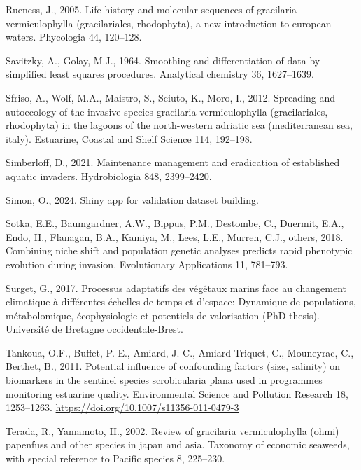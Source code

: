 \documentclass[
  letterpaper,
  DIV=11,
  numbers=noendperiod]{scrartcl}
\newlength{\cslhangindent}
\newenvironment{CSLReferences}[2] %
 {\begin{list}{}{%
  \setlength{\itemindent}{0pt}
  \setlength{\leftmargin}{0pt}
  \setlength{\parsep}{0pt}
  \ifodd #1
   \setlength{\leftmargin}{\cslhangindent}
   \setlength{\itemindent}{-1\cslhangindent}
  \fi
  \setlength{\itemsep}{#2\baselineskip}}}
 {\end{list}}
\begin{document}
\begin{CSLReferences}{1}{0}
Rueness, J., 2005. Life history and molecular sequences of gracilaria
vermiculophylla (gracilariales, rhodophyta), a new introduction to
european waters. Phycologia 44, 120--128.

Savitzky, A., Golay, M.J., 1964. Smoothing and differentiation of data
by simplified least squares procedures. Analytical chemistry 36,
1627--1639.

Sfriso, A., Wolf, M.A., Maistro, S., Sciuto, K., Moro, I., 2012.
Spreading and autoecology of the invasive species gracilaria
vermiculophylla (gracilariales, rhodophyta) in the lagoons of the
north-western adriatic sea (mediterranean sea, italy). Estuarine,
Coastal and Shelf Science 114, 192--198.

Simberloff, D., 2021. Maintenance management and eradication of
established aquatic invaders. Hydrobiologia 848, 2399--2420.

Simon, O., 2024.
\href{https://oirysimon.shinyapps.io/shiny_validate/}{Shiny app for
validation dataset building}.

Sotka, E.E., Baumgardner, A.W., Bippus, P.M., Destombe, C., Duermit,
E.A., Endo, H., Flanagan, B.A., Kamiya, M., Lees, L.E., Murren, C.J.,
others, 2018. Combining niche shift and population genetic analyses
predicts rapid phenotypic evolution during invasion. Evolutionary
Applications 11, 781--793.

Surget, G., 2017. Processus adaptatifs des v{é}g{é}taux marins face au
changement climatique {à} diff{é}rentes {é}chelles de temps et d'espace:
Dynamique de populations, m{é}tabolomique, {é}cophysiologie et
potentiels de valorisation (PhD thesis). Universit{é} de Bretagne
occidentale-Brest.

Tankoua, O.F., Buffet, P.-E., Amiard, J.-C., Amiard-Triquet, C.,
Mouneyrac, C., Berthet, B., 2011. Potential influence of confounding
factors (size, salinity) on biomarkers in the sentinel species
scrobicularia plana used in programmes monitoring estuarine quality.
Environmental Science and Pollution Research 18, 1253--1263.
\url{https://doi.org/10.1007/s11356-011-0479-3}

Terada, R., Yamamoto, H., 2002. Review of gracilaria vermiculophylla
(ohmi) papenfuss and other species in japan and asia. Taxonomy of
economic seaweeds, with special reference to Pacific species 8,
225--230.


\end{CSLReferences}
\end{document}
